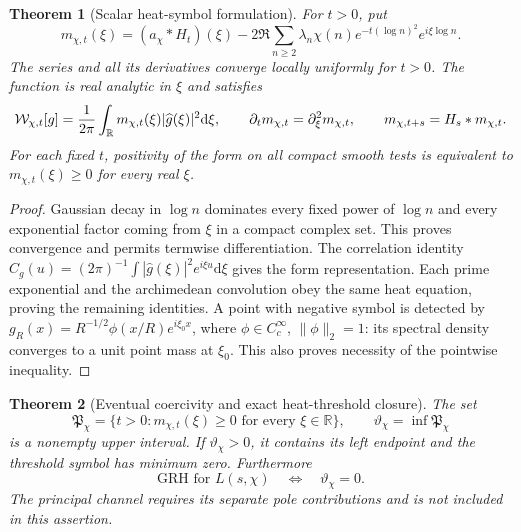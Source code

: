 \documentclass[11pt]{article}
\newtheorem{theorem}{Theorem}[section]
\theoremstyle{definition}
\theoremstyle{remark}
\newcommand{\R}{\mathbb R}
\newcommand{\dd}{\mathrm d}
\begin{document}
\begin{theorem}[Scalar heat-symbol formulation]
\label{thm:gauss-scalar-symbol}
For $t>0$, put
\begin{equation}
 m_{\chi,t}(\xi)=(a_\chi*H_t)(\xi)
 -2\Re\sum_{n\ge2}\lambda_n\chi(n)
                e^{-t(\log n)^2}e^{i\xi\log n}.
 \label{eq:gauss-scalar-symbol}
\end{equation}
The series and all its derivatives converge locally uniformly for
$t>0$.  The function is real analytic in $\xi$ and satisfies
\begin{equation}
 \mathcal W_{\chi,t}[g]={1\over2\pi}
       \int_\R m_{\chi,t}(\xi)|\widehat g(\xi)|^2\dd\xi,
 \qquad
 \partial_t m_{\chi,t}=\partial_\xi^2m_{\chi,t},
 \qquad m_{\chi,t+s}=H_s*m_{\chi,t}.
 \label{eq:gauss-scalar-identities}
\end{equation}
For each fixed $t$, positivity of the form on all compact smooth tests
is equivalent to $m_{\chi,t}(\xi)\ge0$ for every real $\xi$.
\end{theorem}

\begin{proof}
Gaussian decay in $\log n$ dominates every fixed power of $\log n$
and every exponential factor coming from $\xi$ in a compact complex
set.  This proves convergence and permits termwise differentiation.
The correlation identity
$C_g(u)=(2\pi)^{-1}\int|\widehat g(\xi)|^2e^{i\xi u}\dd\xi$
gives the form representation.  Each prime exponential and the
archimedean convolution obey the same heat equation, proving the
remaining identities.  A point with negative symbol is detected by
$g_R(x)=R^{-1/2}\phi(x/R)e^{i\xi_0x}$, where
$\phi\in C_c^\infty$, $\|\phi\|_2=1$: its spectral density converges
to a unit point mass at $\xi_0$.  This also proves necessity of the
pointwise inequality.
\end{proof}

\begin{theorem}[Eventual coercivity and exact heat-threshold closure]
\label{thm:gauss-threshold}
The set
\begin{equation}
 \mathfrak P_\chi=\{t>0:m_{\chi,t}(\xi)\ge0
                             \text{ for every }\xi\in\R\},\qquad
 \vartheta_\chi=\inf\mathfrak P_\chi
 \label{eq:gauss-threshold}
\end{equation}
is a nonempty upper interval.  If $\vartheta_\chi>0$, it contains its
left endpoint and the threshold symbol has minimum zero.  Furthermore
\begin{equation}
 \boxed{\mathrm{GRH}\text{ for }L(s,\chi)
                 \quad\Longleftrightarrow\quad\vartheta_\chi=0.}
 \label{eq:gauss-GRH}
\end{equation}
The principal channel requires its separate pole contributions and is
not included in this assertion.
\end{theorem}
\end{document}
